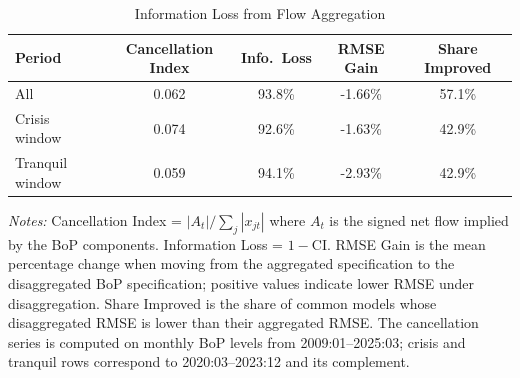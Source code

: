 \begin{table}[htbp]
\centering
\caption{Information Loss from Flow Aggregation}
\label{tab:info_loss}
\small
\setlength{\tabcolsep}{5pt}
\begin{tabular}{lcccc}
\toprule
Period & Cancellation Index & Info.\ Loss & RMSE Gain & Share Improved \\
\midrule
All & 0.062 & 93.8\% & -1.66\% & 57.1\% \\
Crisis window & 0.074 & 92.6\% & -1.63\% & 42.9\% \\
Tranquil window & 0.059 & 94.1\% & -2.93\% & 42.9\% \\
\bottomrule
\end{tabular}
\begin{tablenotes}
\small
\item \textit{Notes:} Cancellation Index = $|A_t|/\sum_j |x_{jt}|$ where $A_t$ is the signed net flow implied by the BoP components. Information Loss = $1 - \text{CI}$. RMSE Gain is the mean percentage change when moving from the aggregated specification to the disaggregated BoP specification; positive values indicate lower RMSE under disaggregation. Share Improved is the share of common models whose disaggregated RMSE is lower than their aggregated RMSE. The cancellation series is computed on monthly BoP levels from 2009:01--2025:03; crisis and tranquil rows correspond to 2020:03--2023:12 and its complement.
\end{tablenotes}
\end{table}

